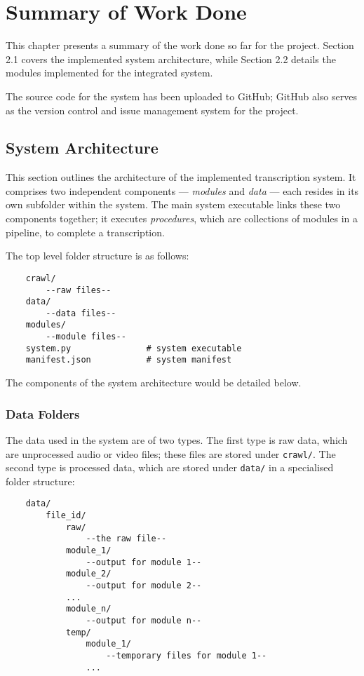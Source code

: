 \chapter{Summary of Work Done}

This chapter presents a summary of the work done so far for the project. Section 2.1 covers the implemented system architecture, while Section 2.2 details the modules implemented for the integrated system.

The source code for the system has been uploaded to GitHub; GitHub also serves as the version control and issue management system for the project.

\section{System Architecture}

This section outlines the architecture of the implemented transcription system. It comprises two independent components --- \textit{modules} and \textit{data} --- each resides in its own subfolder within the system. The main system executable links these two components together; it executes \textit{procedures}, which are collections of modules in a pipeline, to complete a transcription.

The top level folder structure is as follows:

\begin{lstlisting}
    crawl/
        --raw files--
    data/
        --data files--
    modules/
        --module files--
    system.py               # system executable
    manifest.json           # system manifest
\end{lstlisting}

The components of the system architecture would be detailed below.

\subsection{Data Folders}

The data used in the system are of two types. The first type is raw data, which are unprocessed audio or video files; these files are stored under \verb|crawl/|. The second type is processed data, which are stored under \verb|data/| in a specialised folder structure:

\begin{lstlisting}
    data/
        file_id/
            raw/
                --the raw file--
            module_1/
                --output for module 1--
            module_2/
                --output for module 2--
            ...
            module_n/
                --output for module n--
            temp/
                module_1/
                    --temporary files for module 1--
                ...
\end{lstlisting}

